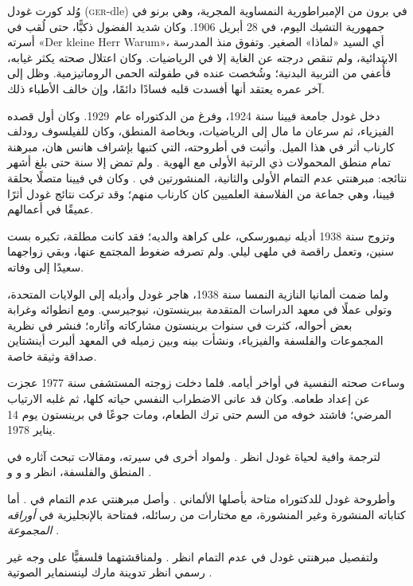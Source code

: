 \documentclass[../../../include/open-logic-section]{subfiles}
\begin{document}



وُلد كورت غودل (\textsc{ger}-dle) في برون من الإمبراطورية
النمساوية المجرية، وهي برنو في جمهورية التشيك اليوم، في 28 أبريل 1906.
وكان شديد الفضول ذكيًّا، حتى لُقب في أسرته «Der kleine Herr Warum»،
أي السيد «لماذا» الصغير. وتفوق منذ المدرسة الابتدائية، ولم تنقص درجته
عن الغاية إلا في الرياضيات. وكان اعتلال صحته يكثر غيابه، فأُعفي من
التربية البدنية؛ وشُخصت عنده في طفولته الحمى الروماتيزمية. وظل إلى آخر
عمره يعتقد أنها أفسدت قلبه فسادًا دائمًا، وإن خالف الأطباء ذلك.

دخل غودل جامعة فيينا سنة 1924، وفرغ من الدكتوراه عام~1929. وكان أول
قصده الفيزياء، ثم سرعان ما مال إلى الرياضيات، وبخاصة المنطق، وكان
للفيلسوف رودلف كارناب أثر في هذا الميل. وأثبت في أطروحته، التي كتبها
بإشراف هانس هان، مبرهنة تمام منطق المحمولات ذي الرتبة الأولى مع الهوية
\citep{Godel1929}. ولم تمض إلا سنة حتى بلغ أشهر نتائجه: مبرهنتي عدم
التمام الأولى والثانية، المنشورتين في \citealt{Godel1931}. وكان في
فيينا متصلًا بحلقة فيينا، وهي جماعة من الفلاسفة العلميين كان كارناب
منهم؛ وقد تركت نتائج غودل أثرًا عميقًا في أعمالهم.

وتزوج سنة 1938 أديله نيمبورسكي، على كراهة والديه؛ فقد كانت مطلقة، تكبره
بست سنين، وتعمل راقصة في ملهى ليلي. ولم تصرفه ضغوط المجتمع عنها، وبقي
زواجهما سعيدًا إلى وفاته.

ولما ضمت ألمانيا النازية النمسا سنة 1938، هاجر غودل وأديله إلى الولايات
المتحدة، وتولى عملًا في معهد الدراسات المتقدمة ببرينستون، نيوجيرسي.
ومع انطوائه وغرابة بعض أحواله، كثرت في سنوات برينستون مشاركاته وآثاره؛
فنشر في نظرية المجموعات والفلسفة والفيزياء، ونشأت بينه وبين زميله في
المعهد ألبرت أينشتاين صداقة وثيقة خاصة.

وساءت صحته النفسية في أواخر أيامه. فلما دخلت زوجته المستشفى سنة 1977
عجزت عن إعداد طعامه. وكان قد عانى الاضطراب النفسي حياته كلها، ثم غلبه
الارتياب المرضي؛ فاشتد خوفه من السم حتى ترك الطعام، ومات جوعًا في
برينستون يوم 14 يناير 1978.

\begin{reading}
لترجمة وافية لحياة غودل انظر \citet{Dawson1997}. ولمواد أخرى في سيرته،
ومقالات تبحث آثاره في المنطق والفلسفة،
انظر \citet{Wang1990} و\citet{Baaz2011} و\citet{Takeuti2003} و
\citet{Sigmund2007}.

وأطروحة غودل للدكتوراه متاحة بأصلها الألماني \citep{Godel1929}.
وأصل مبرهنتي عدم التمام في \citep{Godel1931}. أما كتاباته المنشورة وغير
المنشورة، مع مختارات من رسائله، فمتاحة بالإنجليزية في
\emph{أوراقه المجموعة} \citet{Godel1986,Godel1990}.

ولتفصيل مبرهنتي غودل في عدم التمام انظر \citet{Smith2013}. ولمناقشتهما
فلسفيًّا على وجه غير رسمي انظر تدوينة مارك لينسنماير الصوتية
\citep{Linsenmayer2014}.
\end{reading}
\end{document}
